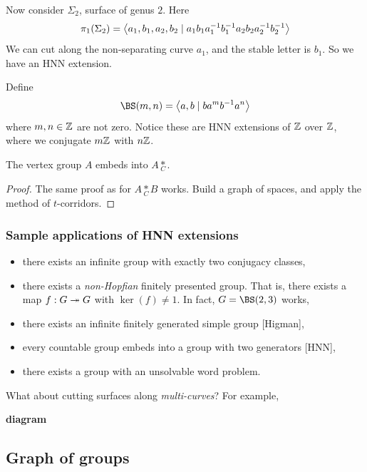 \documentclass{article}
\begin{document}
\begin{example}
    Now consider \(\Sigma_2\), surface of genus \(2\). Here
    \[\pi_1(\Sigma_2) = \left\langle a_1, b_1, a_2, b_2 \mid a_1b_1a_1^{-1}b_1^{-1}a_2b_2a_2^{-1}b_2^{-1} \right\rangle\]
    We can cut along the non-separating curve \(a_1\), and the stable letter is \(b_1\). So we have an HNN extension.
\end{example}

\begin{example}
     Define
    \[\BS(m, n) = \inner{a, b \mid ba^mb^{-1}a^n}\]
    where \(m, n \in \mathbb{Z}\) are not zero. Notice these are HNN extensions of \(\mathbb{Z}\) over \(\mathbb{Z}\), where we conjugate \(m\mathbb{Z}\) with \(n\mathbb{Z}\).
\end{example}

\begin{theorem}
     The vertex group \(A\) embeds into \(A \underset C *\).
\end{theorem}

\begin{proof}
    The same proof as for \(A \underset C * B\) works. Build a graph of spaces, and apply the method of \(t\)-corridors.
\end{proof}

\subsubsection{Sample applications of HNN extensions}

\begin{itemize}
    \item there exists an infinite group with exactly two conjugacy classes,
    \item there exists a \emph{non-Hopfian} finitely presented group. That is, there exists a map \(f : G \twoheadrightarrow G\) with \(\ker(f) \ne 1\). In fact, \(G = \BS(2, 3)\) works,
    \item there exists an infinite finitely generated simple group [Higman],
    \item every countable group embeds into a group with two generators [HNN],
    \item there exists a group with an unsolvable word problem.
\end{itemize}

What about cutting surfaces along \emph{multi-curves}? For example,

\textbf{diagram}

\subsection{Graph of groups}
\end{document}
